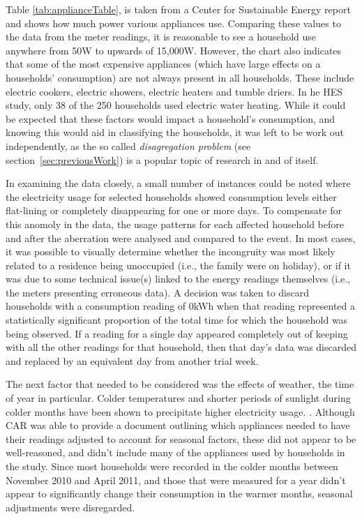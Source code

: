 \badHouseholds

Table \ref{tab:applianceTable}, is taken from a Center for Sustainable Energy \cite{CSE} report and shows how much power various appliances use. Comparing these values to the data from the meter readings, it is reasonable to see a household use anywhere from 50W to upwards of 15,000W. However, the chart also indicates that some of the most expensive appliances (which have large effects on a households' consumption) are not always present in all households. These include electric cookers, electric showers, electric heaters and tumble driers. In he HES study, only 38 of the 250 households used electric water heating. While it could be expected that these factors would impact a household's consumption, and knowing this would aid in classifying the households, it was left to be work out independently, as the so called \textit{disagregation problem} (see section~\ref{sec:previousWork}) is a popular topic of research in and of itself.

\applianceTable


In examining the data closely, a small number of instances could be noted where the electricity usage for selected households showed consumption levels either flat-lining or completely disappearing for one or more days.  To compensate for this anomoly in the data, the usage patterns for each affected household before and after the aberration were analysed and compared to the event.  In most cases, it was possible to visually determine whether the incongruity was most likely related to a residence being unoccupied (i.e., the family were on holiday), or if it was due to some technical issue(s) linked to the energy readings themselves (i.e., the meters presenting erroneous data).  A decision was taken to discard households with a consumption reading of 0kWh when that reading represented a statistically significant proportion of the total time for which the household was being observed.  If a reading for a single day appeared completely out of keeping with all the other readings for that household, then that day's data was discarded and replaced by an equivalent day from another trial week.

The next factor that needed to be considered was the effects of weather, the time of year in particular. Colder temperatures and shorter periods of sunlight during colder months have been shown to precipitate higher electricity usage.  \cite{DECC}. Although CAR was able to provide a document outlining which appliances needed to have their readings adjusted to account for seasonal factors, these did not appear to be well-reasoned, and didn't include many of the appliances used by households in the study. Since most households were recorded in the colder months between November 2010 and April 2011, and those that were measured for a year didn't appear to significantly change their consumption in the warmer months, seasonal adjustments were disregarded.

